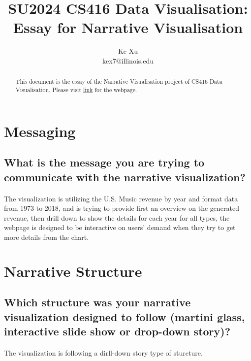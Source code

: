 \documentclass[letterpaper, 11pt]{article}
\title{SU2024 CS416 Data Visualisation: Essay for Narrative Visualisation}
\author{Ke Xu\\ kex7@illinois.edu}
\begin{document}
\maketitle

\begin{abstract}
This document is the essay of the Narrative Visualisation project of CS416 Data Visualisation. Please visit \href{https://kexu1739.github.io/CS416_NarrativeVisualization/}{link} for the webpage.
\end{abstract}

\section{Messaging}
\label{sec:Messaging}


\subsection{What is the message you are trying to communicate with the narrative visualization?}
\label{subsec:1}
\paragraph{} The visualization is utilizing the U.S. Music revenue by year and format data from 1973 to 2018, and is trying to provide first an overview on the generated revenue, then
drill down to show the details for each year for all types, the webpage is designed to be interactive on users' demand when they try to get more details from the chart.


\section{Narrative Structure}
\label{sec:NarrativeStructure}
\subsection{Which structure was your narrative visualization designed to follow (martini glass, interactive slide show or drop-down story)?}
\label{subsec:NarrativeStructure1}
\paragraph{}The visualization is following a dirll-down story type of sturcture. 
\end{document}
